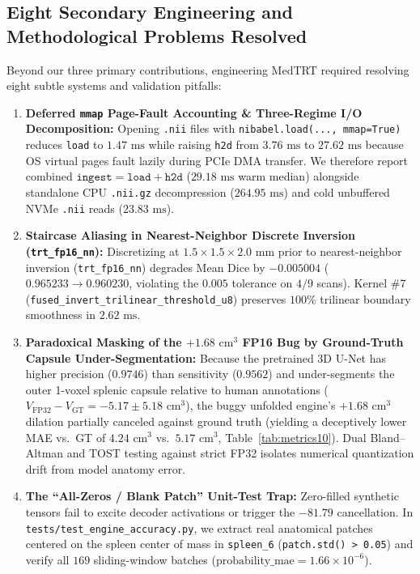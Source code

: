 \documentclass[10pt,twocolumn]{article}
\begin{document}
\subsection{Eight Secondary Engineering and Methodological Problems Resolved}
Beyond our three primary contributions, engineering MedTRT required resolving eight subtle systems and validation pitfalls:
\begin{enumerate}[label=\textbf{Problem \Alph*:},wide=0pt]
    \item \textbf{Deferred \texttt{mmap} Page-Fault Accounting \& Three-Regime I/O Decomposition:} Opening \texttt{.nii} files with \texttt{nibabel.load(..., mmap=True)} reduces \texttt{load} to $1.47\text{ ms}$ while raising \texttt{h2d} from $3.76\text{ ms}$ to $27.62\text{ ms}$ because OS virtual pages fault lazily during PCIe DMA transfer. We therefore report combined $\texttt{ingest} = \texttt{load} + \texttt{h2d}$ ($29.18\text{ ms}$ warm median) alongside standalone CPU \texttt{.nii.gz} decompression ($264.95\text{ ms}$) and cold unbuffered NVMe \texttt{.nii} reads ($23.83\text{ ms}$).
    \item \textbf{Staircase Aliasing in Nearest-Neighbor Discrete Inversion (\texttt{trt\_fp16\_nn}):} Discretizing at $1.5 \times 1.5 \times 2.0\text{ mm}$ prior to nearest-neighbor inversion (\texttt{trt\_fp16\_nn}) degrades Mean Dice by $\mathbf{-0.005004}$ ($0.965233 \to 0.960230$, violating the $0.005$ tolerance on $4/9$ scans). Kernel \#7 (\texttt{fused\_invert\_trilinear\_threshold\_u8}) preserves $100\%$ trilinear boundary smoothness in $2.62\text{ ms}$.
    \item \textbf{Paradoxical Masking of the $+1.68\text{ cm}^3$ FP16 Bug by Ground-Truth Capsule Under-Segmentation:} Because the pretrained 3D U-Net has higher precision ($0.9746$) than sensitivity ($0.9562$) and under-segments the outer 1-voxel splenic capsule relative to human annotations ($V_{\text{FP32}} - V_{\text{GT}} = -5.17 \pm 5.18\text{ cm}^3$), the buggy unfolded engine's $+1.68\text{ cm}^3$ dilation partially canceled against ground truth (yielding a deceptively lower MAE vs.\ GT of $4.24\text{ cm}^3$ vs.\ $5.17\text{ cm}^3$, Table~\ref{tab:metrics10}). Dual Bland--Altman and TOST testing against strict FP32 isolates numerical quantization drift from model anatomy error.
    \item \textbf{The ``All-Zeros / Blank Patch'' Unit-Test Trap:} Zero-filled synthetic tensors fail to excite decoder activations or trigger the $-81.79$ cancellation. In \texttt{tests/test\_engine\_accuracy.py}, we extract real anatomical patches centered on the spleen center of mass in \texttt{spleen\_6} (\texttt{patch.std() > 0.05}) and verify all $169$ sliding-window batches ($\text{probability\_mae} = 1.66 \times 10^{-6}$).

\end{enumerate}
\end{document}
